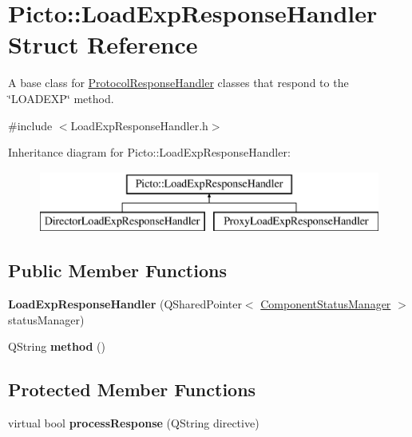 \hypertarget{struct_picto_1_1_load_exp_response_handler}{\section{Picto\-:\-:Load\-Exp\-Response\-Handler Struct Reference}
\label{struct_picto_1_1_load_exp_response_handler}
}


A base class for \hyperlink{struct_picto_1_1_protocol_response_handler}{Protocol\-Response\-Handler} classes that respond to the \char`\"{}\-L\-O\-A\-D\-E\-X\-P\char`\"{} method.  




{\ttfamily \#include $<$Load\-Exp\-Response\-Handler.\-h$>$}

Inheritance diagram for Picto\-:\-:Load\-Exp\-Response\-Handler\-:\begin{figure}[H]
\begin{center}
\leavevmode
\includegraphics[height=2.000000cm]{struct_picto_1_1_load_exp_response_handler}
\end{center}
\end{figure}
\subsection*{Public Member Functions}
\begin{DoxyCompactItemize}
\item 
\hypertarget{struct_picto_1_1_load_exp_response_handler_a79c3d7b16ea36fb35c4bc26f3d64397c}{{\bfseries Load\-Exp\-Response\-Handler} (Q\-Shared\-Pointer$<$ \hyperlink{class_component_status_manager}{Component\-Status\-Manager} $>$ status\-Manager)}\label{struct_picto_1_1_load_exp_response_handler_a79c3d7b16ea36fb35c4bc26f3d64397c}

\item 
\hypertarget{struct_picto_1_1_load_exp_response_handler_aea09f355ed3ef5e69a8674e3798def60}{Q\-String {\bfseries method} ()}\label{struct_picto_1_1_load_exp_response_handler_aea09f355ed3ef5e69a8674e3798def60}

\end{DoxyCompactItemize}
\subsection*{Protected Member Functions}
\begin{DoxyCompactItemize}
\item 
\hypertarget{struct_picto_1_1_load_exp_response_handler_a3fff46bf7d0d85638a568f7fc1a3d3fc}{virtual bool {\bfseries process\-Response} (Q\-String directive)}\label{struct_picto_1_1_load_exp_response_handler_a3fff46bf7d0d85638a568f7fc1a3d3fc}

\end{DoxyCompactItemize}



